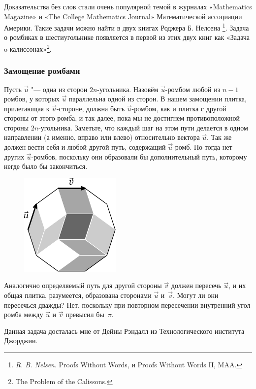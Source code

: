 \documentclass[twoside]{book}
\begin{document}
\heart

Доказательства без слов стали очень популярной темой в журналах «Mathematics Magazine» и «The College Mathematics Journal» Математической ассоциации Америки.
Такие задачи можно найти в двух книгах Роджера Б. Нелсена%
\footnote{\emph{R. B. Nelsen}. {Proofs Without Words,} и {Proofs Without Words II,} MAA.}.
Задача о ромбиках в шестиугольнике появляется в первой из этих двух книг как «Задача o калиссонах»\footnote{The Problem of the Calissons.}.

\subsubsection*{Замощение ромбами}%

Пусть $\vec u$ "--- одна из сторон $2n$-угольника.
Назовём $\vec u$-ромбом любой из $n-1$ ромбов, у которых $\vec u$ параллельна одной из сторон.
В нашем замощении плитка, прилегающая к $\vec u$-стороне, должна быть $\vec u$-ромбом, как и плитка с другой стороны от этого ромба, и так далее, пока мы не достигнем противоположной стороны $2n$-угольника.
Заметьте, что каждый шаг на этом пути делается в одном направлении (а именно, вправо или влево) относительно вектора $\vec u$. 
Так же должен вести себя и любой другой путь, содержащий $\vec u$-ромб.
Но тогда нет других $\vec u$-ромбов, поскольку они образовали бы дополнительный путь, которому негде было бы закончиться.

\begin{figure}[!ht]
\centering
\includegraphics{mp/wink-14} 
\end{figure}

Аналогично определяемый путь для другой стороны $\vec v$ должен пересечь $\vec u$, и их общая плитка, разумеется, образована сторонами $\vec u$ и~$\vec v$.
Могут ли они пересечься дважды?
Нет, поскольку при повторном пересечении внутренний угол ромба между $\vec u$ и $\vec v$ превысил бы~$\pi$. \heart

Данная задача досталась мне от Дейны Рэндалл из Технологического института Джорджии.
\end{document}
